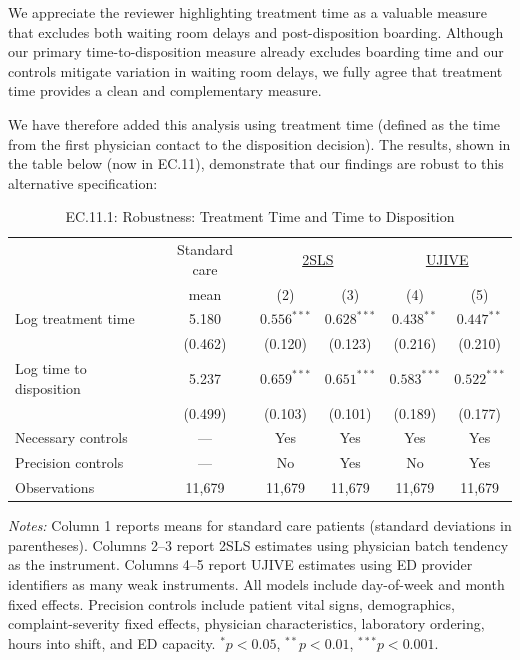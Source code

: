 \documentclass[11pt]{article}
\newcommand{\1}{\hbox{\rm 1\kern-.35em 1}}
\begin{document}
We appreciate the reviewer highlighting treatment time as a valuable measure that excludes both waiting room delays and post-disposition boarding. Although our primary time-to-disposition measure already excludes boarding time and our controls mitigate variation in waiting room delays, we fully agree that treatment time provides a clean and complementary measure.

We have therefore added this analysis using treatment time (defined as the time from the first physician contact to the disposition decision). The results, shown in the table below (now in EC.11), demonstrate that our findings are robust to this alternative specification:

\begin{table}[t!]
\centering
\caption*{EC.11.1: Robustness: Treatment Time and Time to Disposition}
\begin{threeparttable}
\begin{tabular}{lccccc}
\toprule
& Standard care & \multicolumn{2}{c}{\underline{2SLS}} & \multicolumn{2}{c}{\underline{UJIVE}} \\
& mean & (2) & (3) & (4) & (5) \\
\midrule
Log treatment time
& 5.180
& $0.556^{***}$ & $0.628^{***}$
& $0.438^{**}$ & $0.447^{**}$ \\
& (0.462)
& (0.120) & (0.123)
& (0.216) & (0.210) \\[0.75em]

Log time to disposition
& 5.237
& $0.659^{***}$ & $0.651^{***}$
& $0.583^{***}$ & $0.522^{***}$ \\
& (0.499)
& (0.103) & (0.101)
& (0.189) & (0.177) \\[0.5em]

\midrule
Necessary controls & --- & Yes & Yes & Yes & Yes \\
Precision controls & --- & No & Yes & No & Yes \\
Observations & 11{,}679 & 11{,}679 & 11{,}679 & 11{,}679 & 11{,}679 \\
\bottomrule
\end{tabular}

\begin{flushleft}
\footnotesize
\textit{Notes:} Column 1 reports means for standard care patients (standard deviations in parentheses). 
Columns 2–3 report 2SLS estimates using physician batch tendency as the instrument. 
Columns 4–5 report UJIVE estimates using ED provider identifiers as many weak instruments. 
All models include day-of-week and month fixed effects. Precision controls include patient vital signs, demographics, complaint-severity fixed effects, physician characteristics, laboratory ordering, hours into shift, and ED capacity. 
$^{*} p<0.05$, $^{**} p<0.01$, $^{***} p<0.001$.
\end{flushleft}

\end{threeparttable}
\end{table}
\end{document}
